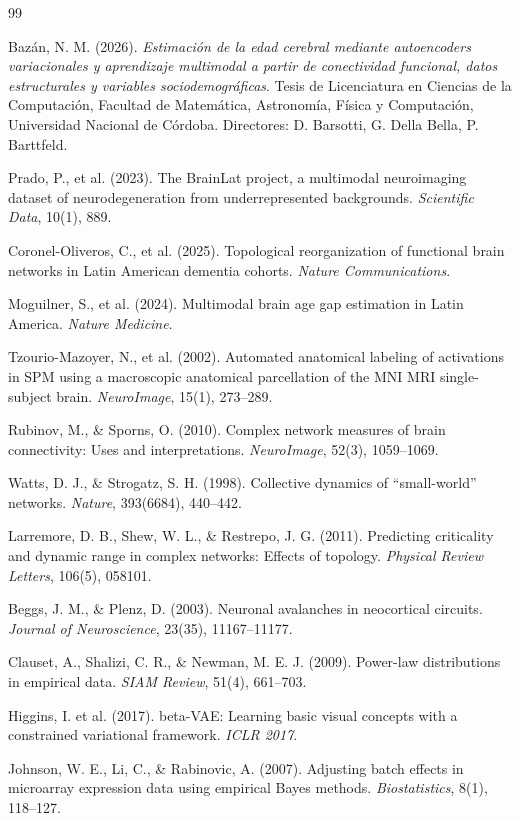 \documentclass[12pt,a4paper]{article}
\begin{document}
\newpage
\begin{thebibliography}{99}

Bazán, N. M. (2026). \textit{Estimación de la edad cerebral mediante autoencoders
variacionales y aprendizaje multimodal a partir de conectividad funcional, datos
estructurales y variables sociodemográficas}. Tesis de Licenciatura en Ciencias de
la Computación, Facultad de Matemática, Astronomía, Física y Computación,
Universidad Nacional de Córdoba. Directores: D. Barsotti, G. Della Bella, P. Barttfeld.

Prado, P., et al. (2023). The BrainLat project, a multimodal neuroimaging dataset of
neurodegeneration from underrepresented backgrounds. \textit{Scientific Data}, 10(1), 889.

Coronel-Oliveros, C., et al. (2025). Topological reorganization of functional brain networks
in Latin American dementia cohorts. \textit{Nature Communications}.

Moguilner, S., et al. (2024). Multimodal brain age gap estimation in Latin America.
\textit{Nature Medicine}.

Tzourio-Mazoyer, N., et al. (2002). Automated anatomical labeling of activations in SPM
using a macroscopic anatomical parcellation of the MNI MRI single-subject brain.
\textit{NeuroImage}, 15(1), 273--289.

Rubinov, M., \& Sporns, O. (2010). Complex network measures of brain connectivity: Uses and
interpretations. \textit{NeuroImage}, 52(3), 1059--1069.

Watts, D. J., \& Strogatz, S. H. (1998). Collective dynamics of ``small-world'' networks.
\textit{Nature}, 393(6684), 440--442.

Larremore, D. B., Shew, W. L., \& Restrepo, J. G. (2011). Predicting criticality and dynamic
range in complex networks: Effects of topology. \textit{Physical Review Letters}, 106(5), 058101.

Beggs, J. M., \& Plenz, D. (2003). Neuronal avalanches in neocortical circuits.
\textit{Journal of Neuroscience}, 23(35), 11167--11177.

Clauset, A., Shalizi, C. R., \& Newman, M. E. J. (2009). Power-law distributions in empirical
data. \textit{SIAM Review}, 51(4), 661--703.

Higgins, I. et al. (2017). beta-VAE: Learning basic visual concepts with a constrained
variational framework. \textit{ICLR 2017}.

Johnson, W. E., Li, C., \& Rabinovic, A. (2007). Adjusting batch effects in microarray
expression data using empirical Bayes methods. \textit{Biostatistics}, 8(1), 118--127.

\end{thebibliography}
\end{document}
